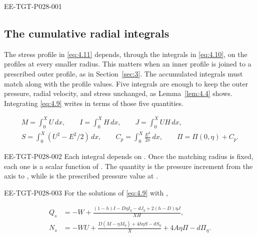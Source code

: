 %
\begin{EESegment}{EE-TGT-P028-001}
\subsection{The cumulative radial integrals}\label{sec:4.2}

The stress profile  in \eqref{eq:4.11}
depends, through the integrals in \eqref{eq:4.10}, on the profiles
 at every smaller radius. This matters when an inner
profile is joined to a prescribed outer profile, as in Section~\ref{sec:3}.
The accumulated integrals must match along with the profile values. Five
integrals are enough to keep the outer pressure, radial velocity, and stress
unchanged, as Lemma~\ref{lem:4.4} shows. Integrating \eqref{eq:4.9} writes
 in terms of those five quantities.
\end{EESegment}
\begin{equation}
\begin{gathered}
 M=\int_0^X U\,dx,\qquad
 I=\int_0^X H\,dx,\qquad
 J=\int_0^X UH\,dx,\\
 S=\int_0^X(U^2-E^2/2)\,dx,\qquad
 C_p=\int_0^X\frac{E^2}{2x}\,dx,\qquad
 \Pi=\Pi(0,\eta)+C_p.
\end{gathered}
\tag{4.15}\label{eq:4.15}
\end{equation}
\begin{EESegment}{EE-TGT-P028-002}
Each integral depends on . Once the matching
radius is fixed, each one is a scalar function of
. The quantity  is the
pressure increment from the axis to , while
 is the prescribed pressure value at
.
\end{EESegment}

\begin{lemma}\label{lem:4.3}
\begin{EESegment}{EE-TGT-P028-003}
For the solutions of \eqref{eq:4.9} with
,
\end{EESegment}
\begin{equation}
\begin{aligned}
 Q_s&=-W+\frac{(1-h)I-D\eta I_\eta-dJ_\eta+2(h-D)\eta J}{XH},\\
 N_s&=-WU+\frac{D(M-\eta M_\eta)+4h\eta S-dS_\eta}{X}
             +4A\eta\Pi-d\Pi_\eta.
\end{aligned}
\tag{4.16}\label{eq:4.16}
\end{equation}
\end{lemma}

